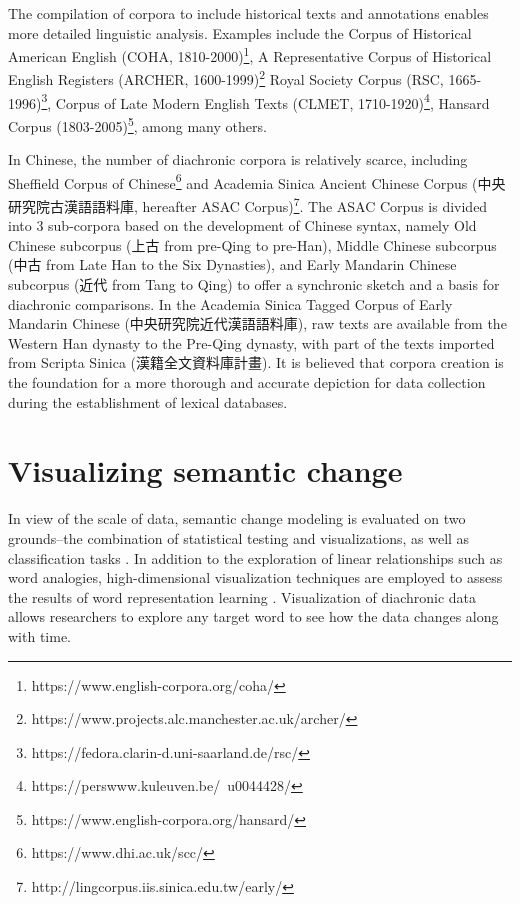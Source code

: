 The compilation of corpora to include historical texts and annotations enables more detailed linguistic analysis. Examples include
the Corpus of Historical American English (COHA, 1810-2000)\footnote{https://www.english-corpora.org/coha/}, 
A Representative Corpus of Historical English Registers (ARCHER, 1600-1999)\footnote{https://www.projects.alc.manchester.ac.uk/archer/}
Royal Society Corpus (RSC, 1665-1996)\footnote{https://fedora.clarin-d.uni-saarland.de/rsc/}, 
Corpus of Late Modern English Texts (CLMET, 1710-1920)\footnote{https://perswww.kuleuven.be/~u0044428/}, 
Hansard Corpus (1803-2005)\footnote{https://www.english-corpora.org/hansard/}, among many others.

In Chinese, the number of diachronic corpora is relatively scarce, including Sheffield Corpus of Chinese\footnote{https://www.dhi.ac.uk/scc/} and Academia Sinica Ancient Chinese Corpus (中央研究院古漢語語料庫, hereafter ASAC Corpus)\footnote{http://lingcorpus.iis.sinica.edu.tw/early/}. The ASAC Corpus is divided into 3 sub-corpora based on the development of Chinese syntax, namely Old Chinese subcorpus (上古 from pre-Qing to pre-Han), Middle Chinese subcorpus (中古 from Late Han to the Six Dynasties), and Early Mandarin Chinese subcorpus (近代 from Tang to Qing) to offer a synchronic sketch and a basis for diachronic comparisons. In the Academia Sinica Tagged Corpus of Early Mandarin Chinese (中央研究院近代漢語語料庫), raw texts are available from the Western Han dynasty to the Pre-Qing dynasty, with part of the texts imported from Scripta Sinica (漢籍全文資料庫計畫). It is believed that corpora creation is the foundation for a more thorough and accurate depiction for data collection during the establishment of lexical databases.



\section{Visualizing semantic change}
In view of the scale of data, semantic change modeling is evaluated on two grounds--the combination of statistical testing and visualizations, as well as classification tasks \parencite{tang2018state}. In addition to the exploration of linear relationships such as word analogies, high-dimensional visualization techniques are employed to assess the results of word representation learning \parencite{liu2017visual}. Visualization of diachronic data allows researchers to explore any target word to see how the data changes along with time.

